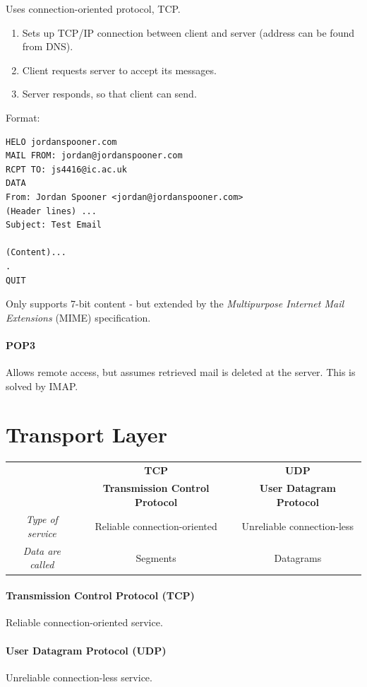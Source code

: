 \documentclass[twocolumn,english]{article}
\providecommand{\tabularnewline}{\\}
\providecommand{\tabularnewline}{\\}
\begin{document}
Uses connection-oriented protocol, TCP.
\begin{enumerate}
\item Sets up TCP/IP connection between client and server (address can be
found from DNS).
\item Client requests server to accept its messages.
\item Server responds, so that client can send.
\end{enumerate}
Format:

\begin{lstlisting}
HELO jordanspooner.com
MAIL FROM: jordan@jordanspooner.com
RCPT TO: js4416@ic.ac.uk
DATA
From: Jordan Spooner <jordan@jordanspooner.com>
(Header lines) ...
Subject: Test Email

(Content)...
.
QUIT
\end{lstlisting}

Only supports 7-bit content - but extended by the \emph{Multipurpose
Internet Mail Extensions} (MIME) specification.

\paragraph{POP3}

Allows remote access, but assumes retrieved mail is deleted at the
server. This is solved by IMAP.

\section{Transport Layer}

\begin{table}[H]
\centering{}%
\begin{tabular}{ccc}
\toprule 
 & \textbf{\footnotesize{}TCP} & \textbf{\footnotesize{}UDP}\tabularnewline
 & \textbf{\footnotesize{}Transmission Control Protocol} & \textbf{\footnotesize{}User Datagram Protocol}\tabularnewline
\midrule
\emph{\footnotesize{}Type of service} & {\footnotesize{}Reliable connection-oriented} & {\footnotesize{}Unreliable connection-less}\tabularnewline
\emph{\footnotesize{}Data are called} & {\footnotesize{}Segments} & {\footnotesize{}Datagrams}\tabularnewline
\bottomrule
\end{tabular}
\end{table}


\paragraph{Transmission Control Protocol (TCP)}

Reliable connection-oriented service.

\paragraph{User Datagram Protocol (UDP)}

Unreliable connection-less service.
\end{document}
